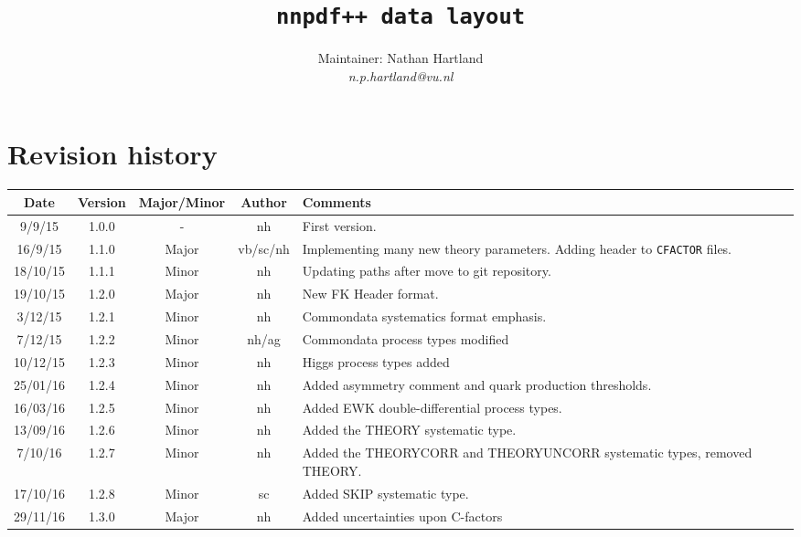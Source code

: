 \documentclass[11pt]{article}
\title{\tt{nnpdf++} data layout}
\author{Maintainer: Nathan Hartland\\ {\it n.p.hartland@vu.nl }}
\begin{document}
\maketitle
\tableofcontents
\clearpage
\section{Revision history}

\begin{table}[htp]
\begin{center}
\begin{tabular}{|c|c|c|c|p{50mm}|}
\hline
Date & Version & Major/Minor & Author & Comments\\
\hline\hline
9/9/15 & 1.0.0 & - & nh & First version.\\
\hline
16/9/15 & 1.1.0 & Major & vb/sc/nh & Implementing many \newline new theory parameters. \newline Adding header to {\tt CFACTOR} files.\\
\hline
18/10/15 & 1.1.1 & Minor & nh & Updating paths after move to git repository. \\
\hline
19/10/15 & 1.2.0 & Major & nh & New FK Header format. \\
\hline
3/12/15 & 1.2.1 & Minor & nh & Commondata systematics format emphasis. \\
\hline
7/12/15 & 1.2.2 & Minor & nh/ag & Commondata process types modified \\
\hline
10/12/15 & 1.2.3 & Minor & nh & Higgs process types added \\
\hline
25/01/16 & 1.2.4 & Minor & nh & Added asymmetry comment and quark production thresholds. \\
\hline
16/03/16 & 1.2.5 & Minor & nh & Added EWK double-differential process types. \\
\hline
13/09/16 & 1.2.6 & Minor & nh & Added the THEORY systematic type. \\
\hline
7/10/16 & 1.2.7 & Minor & nh & Added the THEORYCORR and THEORYUNCORR systematic types, removed THEORY. \\
\hline
17/10/16 & 1.2.8 & Minor & sc & Added SKIP systematic type. \\
\hline
29/11/16 & 1.3.0 & Major & nh & Added uncertainties upon C-factors  \\
\hline
\end{tabular}
\end{center}
\label{tab:revsum}
\end{table}%
\end{document}
